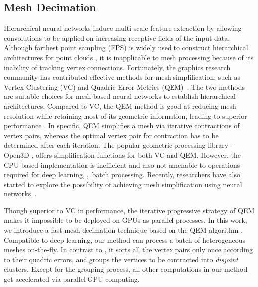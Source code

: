 \subsection{Mesh Decimation}\label{subec:decimation_mesh}
Hierarchical neural networks induce  multi-scale feature extraction by allowing convolutions to be applied on increasing receptive fields of the input data. Although farthest point sampling (FPS) is widely used to construct hierarchical architectures for point clouds \cite{lei2020spherical,qi2017pointnetplusplus,wu2019pointconv}, it is inapplicable to mesh processing because of its inability of tracking vertex connections. 
Fortunately, the graphics research community has contributed effective  methods for mesh simplification, such as Vertex Clustering (VC) \cite{rossignac1993multi} and Quadric Error Metrics (QEM)~\cite{garland1999quadric,garland1997surface}. 
The two methods are suitable choices for mesh-based neural networks \cite{ranjan2018generating,schult2020dualconvmesh,hu2021vmnet} to establish hierarchical architectures. Compared to VC, the QEM method is good at reducing mesh resolution
while retaining most of its geometric information, leading to  superior performance \cite{schult2020dualconvmesh}. In specific, QEM simplifies a mesh via iterative contractions of  vertex pairs, whereas the optimal vertex pair for contraction has to be determined after each iteration. The popular geometric processing library - Open3D  \cite{zhou2018open3d}, offers simplification functions for both VC and QEM. 
However, the  CPU-based implementation is inefficient and also not amenable to operations required for deep learning, \eg,~batch processing. {\color{black}Recently, researchers have also started to explore the possibility of achieving mesh simplification using neural networks~\cite{potamias2022neural}.}

Though superior to VC in performance, the iterative progressive strategy of QEM makes it  impossible to be deployed on GPUs as parallel processes. In this work, we introduce a fast mesh decimation technique based on the QEM algorithm \cite{garland1997surface}. Compatible to deep learning, our method can process a batch of heterogeneous meshes on-the-fly. In contrast to \cite{garland1997surface}, it sorts all the vertex pairs only once according to their quadric errors, and groups the vertices to be contracted into \textit{disjoint} clusters. Except for the grouping process, all other computations in our method get accelerated via parallel GPU computing. 

